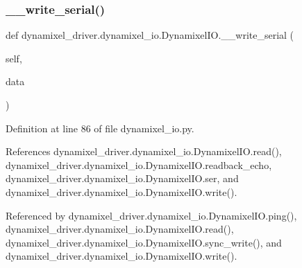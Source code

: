 \subsubsection{\texorpdfstring{\+\_\+\+\_\+write\+\_\+serial()}{\_\_write\_serial()}}
{\footnotesize\ttfamily def dynamixel\+\_\+driver.\+dynamixel\+\_\+io.\+Dynamixel\+I\+O.\+\_\+\+\_\+write\+\_\+serial (\begin{DoxyParamCaption}\item[{}]{self,  }\item[{}]{data }\end{DoxyParamCaption})\hspace{0.3cm}{\ttfamily [private]}}



Definition at line 86 of file dynamixel\+\_\+io.\+py.



References dynamixel\+\_\+driver.\+dynamixel\+\_\+io.\+Dynamixel\+I\+O.\+read(), dynamixel\+\_\+driver.\+dynamixel\+\_\+io.\+Dynamixel\+I\+O.\+readback\+\_\+echo, dynamixel\+\_\+driver.\+dynamixel\+\_\+io.\+Dynamixel\+I\+O.\+ser, and dynamixel\+\_\+driver.\+dynamixel\+\_\+io.\+Dynamixel\+I\+O.\+write().



Referenced by dynamixel\+\_\+driver.\+dynamixel\+\_\+io.\+Dynamixel\+I\+O.\+ping(), dynamixel\+\_\+driver.\+dynamixel\+\_\+io.\+Dynamixel\+I\+O.\+read(), dynamixel\+\_\+driver.\+dynamixel\+\_\+io.\+Dynamixel\+I\+O.\+sync\+\_\+write(), and dynamixel\+\_\+driver.\+dynamixel\+\_\+io.\+Dynamixel\+I\+O.\+write().


